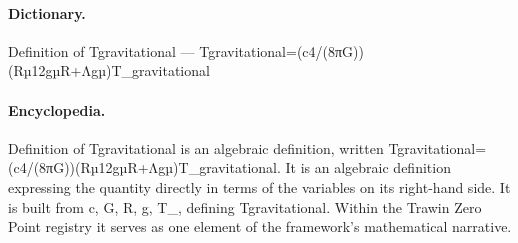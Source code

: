\paragraph{Dictionary.}
Definition of Tgravitational — Tgravitational=(c4/(8πG))(Rµ12gµR+Λgµ)T\_gravitational

\paragraph{Encyclopedia.}
Definition of Tgravitational is an algebraic definition, written Tgravitational=(c4/(8πG))(Rµ12gµR+Λgµ)T\_gravitational. It is an algebraic definition expressing the quantity directly in terms of the variables on its right-hand side. It is built from c, G, R, g, T\_, defining Tgravitational. Within the Trawin Zero Point registry it serves as one element of the framework's mathematical narrative.
